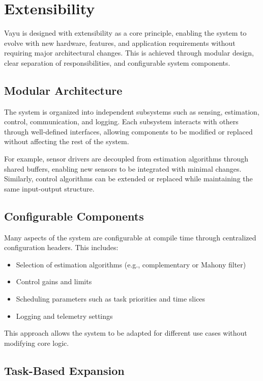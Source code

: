 \section{Extensibility}
\label{sec:vayu_extensibility}

Vayu is designed with extensibility as a core principle, enabling the system to evolve with new hardware, features, and application requirements without requiring major architectural changes. This is achieved through modular design, clear separation of responsibilities, and configurable system components.

\subsection{Modular Architecture}

The system is organized into independent subsystems such as sensing, estimation, control, communication, and logging. Each subsystem interacts with others through well-defined interfaces, allowing components to be modified or replaced without affecting the rest of the system.

For example, sensor drivers are decoupled from estimation algorithms through shared buffers, enabling new sensors to be integrated with minimal changes. Similarly, control algorithms can be extended or replaced while maintaining the same input-output structure.

\subsection{Configurable Components}

Many aspects of the system are configurable at compile time through centralized configuration headers. This includes:
\begin{itemize}
    \item Selection of estimation algorithms (e.g., complementary or Mahony filter)
    \item Control gains and limits
    \item Scheduling parameters such as task priorities and time slices
    \item Logging and telemetry settings
\end{itemize}

This approach allows the system to be adapted for different use cases without modifying core logic.

\subsection{Task-Based Expansion}

